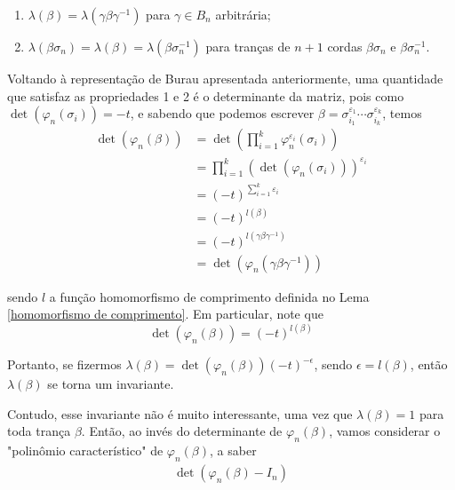 \documentclass[a4paper,portuguese,11pt,twoside, leqno]{book}
\theoremstyle{definition}
\begin{document}
	\begin{enumerate}
		\item $\lambda(\beta) = \lambda(\gamma\beta\gamma^{-1})$ para $\gamma\in B_n$ arbitrária;
		\item $\lambda(\beta\sigma_n) = \lambda(\beta) = \lambda(\beta\sigma_n^{-1})$ para tranças de $n+1$ cordas $\beta\sigma_n$ e $\beta\sigma_n^{-1}$.
	\end{enumerate}
	\par\vspace{0.3cm} Voltando à representação de Burau apresentada anteriormente, uma quantidade que satisfaz as propriedades 1 e 2 é o determinante da matriz, pois como $\det(\varphi_n(\sigma_i)) = -t$, e sabendo que podemos escrever $\beta = \sigma_{i_1}^{\varepsilon_1}\cdots\sigma_{i_k}^{\varepsilon_k}$, temos
	\begin{align*} 
	\det(\varphi_n(\beta)) 
	&= 
	\det\left( \prod_{i=1}^{k}\varphi_n^{\varepsilon_i}(\sigma_i) \right)
	\\ 
	&= \prod_{i=1}^{k}(\det(\varphi_n(\sigma_i)))^{\varepsilon_i}
	\\ 
	&= (-t)^{\sum_{i=1}^{k}\varepsilon_i}
	\\
	&=(-t)^{l(\beta)} 
	\\
	&=(-t)^{l(\gamma\beta\gamma^{-1})} 
	\\
	&=\det(\varphi_n(\gamma\beta\gamma^{-1}))
	\end{align*} 
	\par\vspace{0.3cm} sendo $l$ a função homomorfismo de comprimento definida no Lema \eqref{homomorfismo de comprimento}. Em particular, note que
	\begin{equation}
	\label{det Burau de beta}
	\det(\varphi_n(\beta)) = (-t)^{l(\beta)}
	\end{equation}
	\par \vspace{0.3cm} Portanto, se fizermos $\lambda(\beta) = \det(\varphi_n(\beta))(-t)^{-\epsilon}$, sendo $\epsilon=l(\beta)$, então $\lambda(\beta)$ se torna um invariante. 
	\par\vspace{0.3cm} Contudo, esse invariante não é muito interessante, uma vez que $\lambda(\beta) = 1$ para toda trança $\beta$. Então, ao invés do determinante de $\varphi_n(\beta)$, vamos considerar o "polinômio característico" de $\varphi_n(\beta)$, a saber
	\begin{align*}
	\det(\varphi_n(\beta) - I_n)
	\end{align*}
\end{document}
